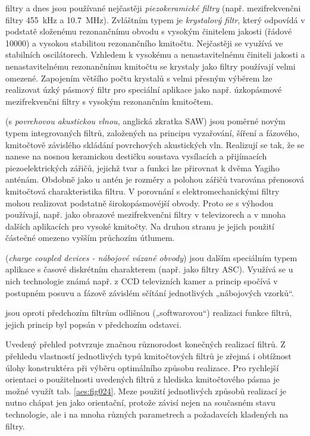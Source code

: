 \begin{description}[noitemsep]
              filtry a dnes jsou používané nejčastěji \emph{piezokeramické filtry} (např.
              mezifrekvenčni filtry \SI{455}{\kilo\hertz} a \SI{10.7}{\mega\hertz}).
              Zvláštním typem je \emph{krystalový filtr}, který odpovídá v podstatě složenému
              rezonančnímu obvodu s vysokým činitelem jakosti (řádové \num{10000}) a vysokou
              stabilitou rezonančního kmitočtu. Nejčastěji se využívá ve stabilních oscilátorech.
              Vzhledem k vysokému a nenastavitelnému činiteli jakosti a nenastavitelnému
              rezonančnímu kmitočtu se krystaly jako filtry používají velmi omezené. Zapojením
              většího počtu krystalů s velmi přesným výběrem lze realizovat úzký pásmový filtr pro
              speciální aplikace jako např. úzkopásmové mezifrekvenčni filtry s vysokým
              rezonančním kmitočtem.
        \item[\textbf{Filtry s PAV}] (s \emph{povrchovou akustickou vlnou}, anglická zkratka SAW)
              jsou poměrné novým typem integrovaných filtrů, založených na principu vyzařování,
              šíření a fázového, kmitočtově závislého skládání povrchových akustických vln.
              Realizují se tak, že se nanese na nosnou keramickou destičku soustava vysílacích a
              přijímacích piezoelektrických zářičů, jejichž tvar a funkci lze přirovnat k dvěma
              Yagiho anténám. Obdobně jako u antén je rozměry a polohou zářičů tvarována přenosová
              kmitočtová charakteristika filtru. V porovnání s elektromechanickými filtry mohou
              realizovat podstatně širokopásmovéjší obvody. Proto se s výhodou používají, např.
              jako obrazové mezifrekvenčni filtry v televizorech a v mnoha dalších aplikacích pro
              vysoké kmitočty. Na druhou stranu je jejich použití částečné omezeno vyšším
              průchozím útlumem.
        \item[\textbf{Filtry CCD}] (\emph{charge coupled devices - nábojové vázané obvody}) jsou
              dalším speciálním typem aplikace s časové diskrétním charakterem (např. jako filtry
              ASC). Využívá se u nich technologie známá např. z CCD televizních kamer a princip
              spočívá v postupném posuvu a fázově závislém sčítání jednotlivých „nábojových
              vzorků“.
        \item[\textbf{Číslicové filtry}] jsou oproti předchozím filtrům odlišnou („softwarovou“)
              realizaci funkce filtrů, jejich princip byl popsán v předchozím odstavci.
      \end{description}
      Uvedený přehled potvrzuje značnou různorodost konečných realizací filtrů. Z přehledu
      vlastností jednotlivých typů kmitočtových filtrů je zřejmá i obtížnost úlohy konstruktéra
      při výběru optimálního způsobu realizace. Pro rychlejší orientaci o použitelnosti
      uvedených filtrů z hlediska kmitočtového pásma je možné využít tab.
      \ref{aes:fig024}. Meze použití jednotlivých způsobů realizací je nutno chápat
      jen jako orientační, protože závisí nejen na současném stavu technologie, ale i na mnoha
      různých parametrech a požadavcích kladených na filtry.

